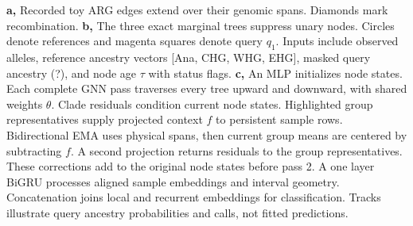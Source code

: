 \textbf{a,} Recorded toy ARG edges extend over their genomic spans. Diamonds mark recombination.
\textbf{b,} The three exact marginal trees suppress unary nodes. Circles denote references and magenta squares denote query $q_1$. Inputs include observed alleles, reference ancestry vectors [Ana, CHG, WHG, EHG], masked query ancestry (?), and node age $\tau$ with status flags.
\textbf{c,} An MLP initializes node states. Each complete GNN pass traverses every tree upward and downward, with shared weights $\theta$. Clade residuals condition current node states. Highlighted group representatives supply projected context $f$ to persistent sample rows. Bidirectional EMA uses physical spans, then current group means are centered by subtracting $f$. A second projection returns residuals to the group representatives. These corrections add to the original node states before pass 2. A one layer BiGRU processes aligned sample embeddings and interval geometry. Concatenation joins local and recurrent embeddings for classification. Tracks illustrate query ancestry probabilities and calls, not fitted predictions.
